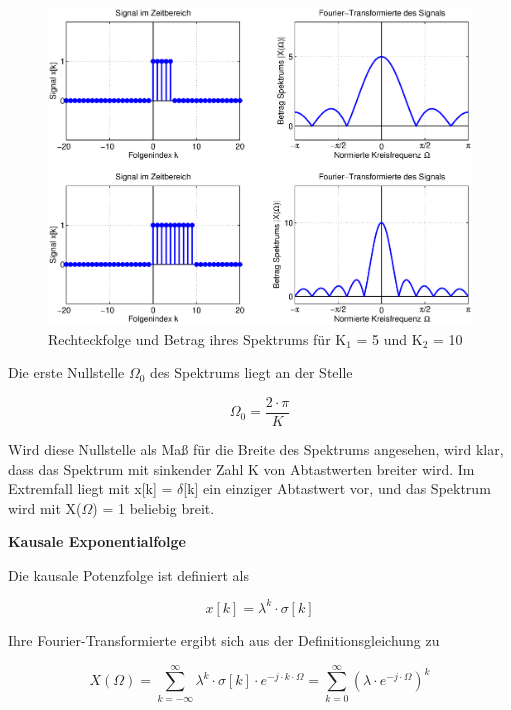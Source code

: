 \begin{figure}[H]
  \centerline{\includegraphics[width=1\textwidth]{Kapitel7/Bilder/image2.eps}}
  \caption{Rechteckfolge und Betrag ihres Spektrums f\"{u}r K${}_{1}$ = 5 und K${}_{2}$ = 10}
  \label{fig:FourierRechteckfolge}
\end{figure}

\noindent Die erste Nullstelle $\Omega_{0}$ des Spektrums liegt an der Stelle

\begin{equation}\label{eq:seventwentyfour}
\Omega _{0} =\frac{2\cdot \pi }{K}
\end{equation}

\noindent Wird diese Nullstelle als Ma{\ss} f\"{u}r die Breite des Spektrums angesehen, wird klar, dass das Spektrum mit sinkender Zahl K von Abtastwerten breiter wird. Im Extremfall liegt mit x[k] = $\delta$[k] ein einziger Abtastwert vor, und das Spektrum wird mit X($\Omega$) = 1 beliebig breit.\bigskip

{\selectfont
\noindent\textbf{Kausale Exponentialfolge}}\smallskip

\noindent Die kausale Potenzfolge ist definiert als 

\begin{equation}\label{eq:seventwentyfive}
x\left[k\right]=\lambda ^{k} \cdot \sigma \left[k\right]
\end{equation}

\noindent Ihre Fourier-Transformierte ergibt sich aus der Definitionsgleichung zu 

\begin{equation}\label{eq:seventwentysix}
X\left(\Omega \right)=\sum _{k=-\infty }^{\infty }\lambda ^{k} \cdot \sigma \left[k\right]\cdot e^{-j\cdot k\cdot \Omega }  =\sum _{k=0}^{\infty }\left(\lambda \cdot e^{-j\cdot \Omega } \right)^{k}
\end{equation}

